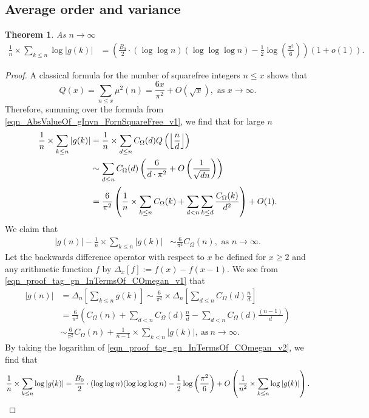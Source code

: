 \documentclass[11pt,reqno,a4letter]{article}
\numberwithin{equation}{section}
\numberwithin{figure}{section}
\numberwithin{table}{section}
\newcommand{\seqnum}[1]{\href{http://oeis.org/#1}{\color{ProcessBlue}{\underline{#1}}}}
\newcommand{\Floor}[2]{\ensuremath{\left\lfloor \frac{#1}{#2} \right\rfloor}}
\theoremstyle{plain}
\newtheorem{theorem}{Theorem}
\numberwithin{theorem}{section}
\theoremstyle{definition}
\begin{document}
\subsection{Average order and variance} 

\begin{theorem} 
\label{cor_ExpectationFormulaAbsgInvn_v2} 
As $n \rightarrow \infty$ 
\begin{align*} 
\frac{1}{n} \times \sum_{k \leq n} \log |g(k)| & = 
	\left(\frac{B_0}{2} \cdot (\log\log n)(\log\log\log n) - 
	\frac{1}{2} \log\left(\frac{\pi^2}{6}\right)\right)(1 + o(1)). 
\end{align*} 
\end{theorem} 
\begin{proof}
A classical formula for the number of squarefree integers $n \leq x$ shows that 
\cite[\S 18.6]{HARDYWRIGHT} \cite[\seqnum{A013928}]{OEIS} 
\[ 
Q(x) = \sum_{n \leq x} \mu^2(n) = \frac{6x}{\pi^2} + O\left(\sqrt{x}\right), 
     \text{\ as $x \rightarrow \infty$}. 
\]
Therefore, summing over the formula from 
\eqref{eqn_AbsValueOf_gInvn_FornSquareFree_v1}, we find that for large $n$  
\begin{align} 
\notag 
\frac{1}{n} \times \sum_{k \leq n} |g(k)| & = \frac{1}{n} \times \sum_{d \leq n} 
     C_{\Omega}(d) Q\left(\Floor{n}{d}\right) \\ 
\notag 
     & \sim \sum_{d \leq n} C_{\Omega}(d) \left(\frac{6}{d \cdot \pi^2} + O\left(\frac{1}{\sqrt{dn}}\right) 
     \right) \\ 
\label{eqn_proof_tag_gn_InTermsOf_COmegan_v1}
     & = \frac{6}{\pi^2} \left(\frac{1}{n} \times \sum_{k \leq n} C_{\Omega}(k) + \sum_{d<n} 
     \sum_{k \leq d} \frac{C_{\Omega}(k)}{d^2}\right) + O(1). 
\end{align} 
We claim that 
\begin{align}
\label{eqn_proof_tag_gn_InTermsOf_COmegan_v2}
|g(n)| - \frac{1}{n} \times \sum_{k \leq n} |g(k)| & \sim \frac{6}{\pi^2} C_{\Omega}(n), 
     \text{\ as\ } n \rightarrow \infty. 
\end{align} 
Let the backwards difference operator with respect to $x$ 
be defined for $x \geq 2$ and any arithmetic function $f$ by 
$\Delta_x[f] := f(x) - f(x-1)$. 
We see from \eqref{eqn_proof_tag_gn_InTermsOf_COmegan_v1} that 
\begin{align*} 
     |g(n)| & = \Delta_n\left[\sum_{k \leq n} g(k)\right]  
     \sim \frac{6}{\pi^2} \times 
     \Delta_n\left[\sum_{d \leq n} C_{\Omega}(d) \frac{n}{d}\right] \\ 
     & = \frac{6}{\pi^2}\left(C_{\Omega}(n) + \sum_{d < n} C_{\Omega}(d) \frac{n}{d} - 
     \sum_{d<n} C_{\Omega}(d) \frac{(n-1)}{d}\right) \\ 
     & \sim \frac{6}{\pi^2} C_{\Omega}(n) + \frac{1}{n-1} \times \sum_{k < n} |g(k)|, 
     \mathrm{\ as\ } n \rightarrow \infty. 
\end{align*} 
By taking the logarithm of \eqref{eqn_proof_tag_gn_InTermsOf_COmegan_v2}, we find that
\[
\frac{1}{n} \times \sum_{k \leq n} \log |g(k)| = 
	\frac{B_0}{2} \cdot (\log\log n) (\log\log\log n) - 
     \frac{1}{2}\log\left(\frac{\pi^2}{6}\right) + 
     O\left(\frac{1}{n^2} \times \sum_{k \leq n} \log |g(k)|\right). 
     \qedhere
\]
\end{proof} 
\end{document}
